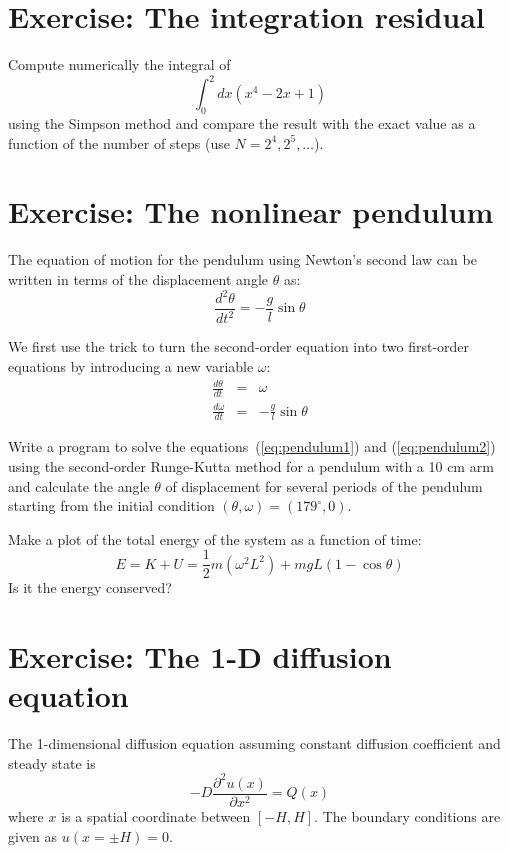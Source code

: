 \documentclass[10pt]{article}
\begin{document}
\section{Exercise: The integration residual}

Compute numerically the integral of 
%
\begin{equation}
\int_0^2 dx (x^4 - 2x + 1)
\end{equation}
%
using the Simpson method and compare the result with the exact value as a function of the number of steps (use $N = 2^4, 2^5, \dots$).

\section{Exercise: The nonlinear pendulum}

The equation of motion for the pendulum using Newton's second law can be written in terms of the displacement angle $\theta$ as:
%
\begin{equation}\label{eq:pendulum}
\frac{d^2\theta}{dt^2} = - \frac{g}{l} \sin \theta
\end{equation}

We first use the trick to turn the second-order equation into two first-order equations by introducing a new variable $\omega$:
%
\begin{eqnarray}
\frac{d\theta}{dt} & = & \omega \label{eq:pendulum1}\\ 
\frac{d\omega}{dt} & = & -\frac{g}{l} \sin \theta \label{eq:pendulum2}
\end{eqnarray}

Write a program to solve the equations~(\ref{eq:pendulum1}) and (\ref{eq:pendulum2}) using the second-order Runge-Kutta method for a pendulum with a 10 cm arm and calculate the angle $\theta$ of displacement for several periods of the pendulum starting from the initial condition $(\theta, \omega) = (179^\circ, 0)$.

Make a plot of the total energy of the system as a function of time:
%
\begin{equation}
E = K + U = \frac{1}{2} m (\omega^2 L^2) + m g L (1 - \cos \theta) 
\end{equation}
%
Is it the energy conserved?

\section{Exercise: The 1-D diffusion equation}

The 1-dimensional diffusion equation assuming constant diffusion coefficient and steady state is
%
\begin{equation}\label{eq:diffusion}
-D\frac{\partial^2 u(x)}{\partial x^2} = Q(x)
\end{equation}
%
where $x$ is a spatial coordinate between $[-H,H]$. The boundary conditions are given as $u(x = \pm H) = 0$.
\end{document}
